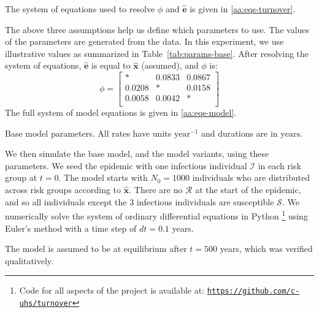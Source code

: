 The system of equations used to resolve $\phi$ and $\bm{\hat{e}}$  %
is given in \ref{aa:eqs-turnover}. %
\par
The above three assumptions help us define which parameters to use. The values of the parameters are generated from the data.
In this experiment, we use illustrative values as summarized in Table~\ref{tab:params-base}.
After resolving the system of equations,
$\bm{\hat{e}}$ is equal to $\bm{\hat{x}}$ (assumed),
and $\phi$ is:
\begin{equation}
\phi = \left[\begin{array}{ccc}
*      & 0.0833 & 0.0867 \\
0.0208 & *      & 0.0158 \\
0.0058 & 0.0042 & *      \\
\end{array}\right]
\end{equation}
The full system of model equations is given in \ref{aa:eqs-model}. %
\begin{table}
  \centering
  \caption{Base model parameters.
    All rates have units $\mathrm{year}^{-1}$ and durations are in $\mathrm{years}$.}
  \label{tab:params-base}
  
\end{table}
\par

We then simulate the base model, and the model variants, using these parameters.
We seed the epidemic with one infectious individual $\mathcal{I}$ in each risk group
at $t = 0$. The model starts with $N_0 = 1000$ individuals who are distributed across risk groups according to $\bm{\hat{x}}$.
There are no $\mathcal{R}$ at the start of the epidemic, and so all individuals except the 3 infectious individuals are susceptible $\mathcal{S}$.
We numerically solve the system of ordinary differential equations 
in Python%
\footnote{Code for all aspects of the project is available at:
  \href{https://github.com/c-uhs/turnover}{\texttt{https://github.com/c-uhs/turnover}}}
using Euler's method with a time step of $dt = 0.1$ years.

The model is assumed to be at equilibrium after $t = 500$ years,
which was verified qualitatively. %

